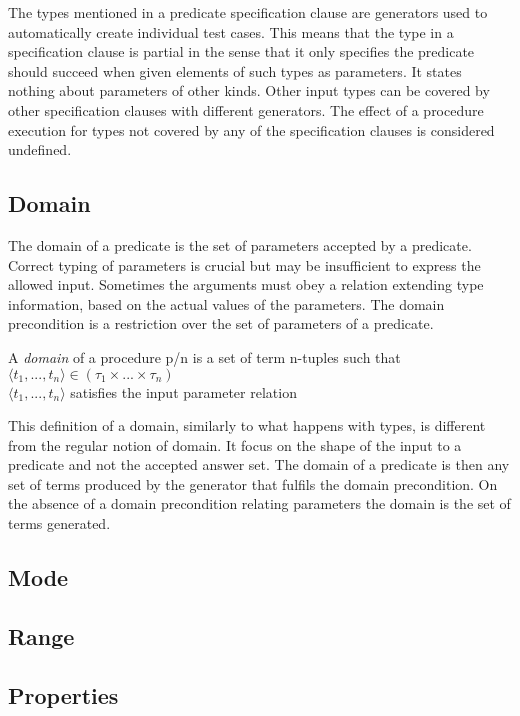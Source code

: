 The types mentioned in a predicate specification clause are \plqc{}
generators used to automatically create individual test cases.
%
This means that the type in a specification clause is partial in the
sense that it only specifies the predicate should succeed when given
elements of such types as parameters.
%
It states nothing about parameters of other kinds.
%
Other input types can be covered by other specification clauses with
different generators.
%
The effect of a procedure execution for types not covered by any of the
specification clauses is considered undefined.


\subsection{Domain}

The domain of a predicate is the set of parameters accepted by a
predicate.
%
Correct typing of parameters is crucial but may be insufficient to
express the allowed input.
%
Sometimes the arguments must obey a relation extending type information,
based on the actual values of the parameters.
%
The domain precondition is a restriction over the set of parameters of a
predicate.


\begin{definition}
\label{def:type}
A {\em domain} of a procedure p/n is a set of term
n-tuples such that\\
\qquad $\langle t_1,...,t_n \rangle \in (\tau_1 \times ... \times
\tau_n)$\\
\qquad $\langle t_1,...,t_n \rangle$ satisfies the input parameter relation
\end{definition}


This definition of a domain, similarly to what happens with types, is
different from the regular notion of domain.
%
It focus on the shape of the input to a predicate and not the accepted
answer set.
%
The \plqc{} domain of a predicate is then any set of terms produced by
the generator that fulfils the domain precondition.
%
On the absence of a domain precondition relating parameters the domain
is the set of terms generated.


\subsection{Mode}
\subsection{Range}
\subsection{Properties}

